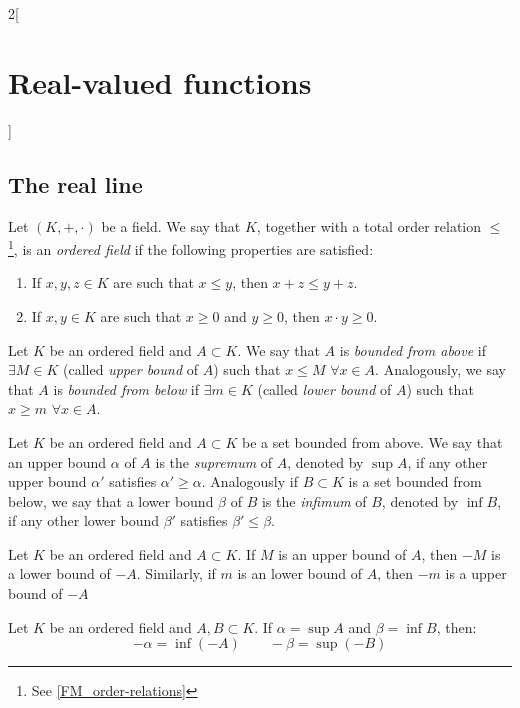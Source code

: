 \documentclass[../../../main.tex]{subfiles}
\begin{document}
\begin{multicols}{2}[\section{Real-valued functions}]
  \subsection{The real line}
  \begin{definition}
    Let $(K,+,\cdot)$ be a field. We say that $K$, together with a total order relation $\leq$\footnote{See \cref{FM_order-relations}}, is an \emph{ordered field} if the following properties are satisfied:
    \begin{enumerate}
      \item If $x,y,z\in K$ are such that $x\leq y$, then $x+z\leq y+z$.
      \item If $x,y\in K$ are such that $x\geq0$ and $y\geq0$, then $x\cdot y\geq 0$.
    \end{enumerate}
  \end{definition}
  \begin{definition}
    Let $K$ be an ordered field and $A\subset K$. We say that $A$ is \emph{bounded from above} if $\exists M\in K$ (called \emph{upper bound} of $A$) such that $x\leq M$ $\forall x\in A$. Analogously, we say that $A$ is \emph{bounded from below} if $\exists m\in K$ (called \emph{lower bound} of $A$) such that $x\geq m$ $\forall x\in A$.
  \end{definition}
  \begin{definition}
    Let $K$ be an ordered field and $A\subset K$ be a set bounded from above. We say that an upper bound $\alpha$ of $A$ is the \emph{supremum} of $A$, denoted by $\sup A$, if any other upper bound $\alpha'$ satisfies $\alpha'\geq\alpha$.
    Analogously if $B\subset K$ is a set bounded from below, we say that a lower bound $\beta$ of $B$ is the \emph{infimum} of $B$, denoted by $\inf B$, if any other lower bound $\beta'$ satisfies $\beta'\leq\beta$.
  \end{definition}
  \begin{proposition}
    Let $K$ be an ordered field and $A\subset K$. If $M$ is an upper bound of $A$, then $-M$ is a lower bound of $-A$. Similarly, if $m$ is an lower bound of $A$, then $-m$ is a upper bound of $-A$
  \end{proposition}
  \begin{proposition}
    Let $K$ be an ordered field and $A,B\subset K$. If $\alpha=\sup A$ and $\beta=\inf B$, then: $$-\alpha=\inf(-A)\qquad-\beta=\sup(-B)$$

\end{proposition}
\end{multicols}
\end{document}
